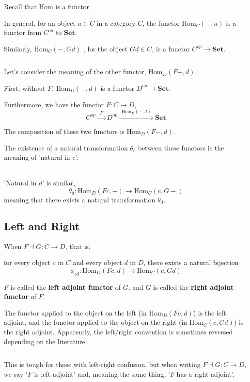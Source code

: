 \documentclass[uplatex,a4j,12pt,dvipdfmx]{jsarticle}
\begin{document}
Recall that Hom is a functor.

In general, for an object $a \in C$ in a category $C$,
the functor $\mathrm{Hom}_{C}(-,a)$ is a functor from $C^{op}$ to $\mathbf{Set}$.

Similarly,
$\mathrm{Hom}_{C}(-,Gd)$
, for the object $Gd \in C$,
is a functor $C^{op} \to \mathbf{Set}$.

${}$

Let's consider the meaning of the other functor,
$\mathrm{Hom}_{D}(F-,d)$.

First, without $F$,
$\mathrm{Hom}_{D}(-,d)$
is a functor
$D^{op} \to \mathbf{Set}$.

Furthermore, we have the functor $F: C \to D$,
$$
	C^{op} \xrightarrow{ \ \ F \ \ } D^{op} \xrightarrow{ \ \ \mathrm{Hom}_{D}(-,d) \ \ } \mathbf{Set}
$$

The composition of these two functors is
$\mathrm{Hom}_{D}(F-,d)$.

The existence of a natural transformation $\theta_{c}$ between these functors is the meaning of 'natural in $c$'.

\ \\

'Natural in $d$' is similar,
$$
	\theta_{d} : \mathrm{Hom}_{D}(Fc,-) \to \mathrm{Hom}_{C}(c,G-)
$$
meaning that there exists a natural transformation $\theta_{d}$.


\subsection{Left and Right}

When $F \dashv G : C \to D$, that is,

for every object $c$ in $C$ and every object $d$ in $D$, there exists a natural bijection
$$
	\phi_{cd} : \mathrm{Hom}_{D}(Fc,d) \to \mathrm{Hom}_{C}(c,Gd)
$$

$F$ is called the \textbf{left adjoint functor} of $G$,
and $G$ is called the \textbf{right adjoint functor} of $F$.

The functor applied to the object on the left (in $\mathrm{Hom}_{D}(Fc,d)$) is the left adjoint,
and the functor applied to the object on the right (in $\mathrm{Hom}_{C}(c,Gd)$) is the right adjoint.
Apparently, the left/right convention is sometimes reversed depending on the literature.

${}$

This is tough for those with left-right confusion, but
when writing
$F \dashv G : C \to D$,
we say '$F$ is left adjoint' and, meaning the same thing, '$F$ has a right adjoint'.
\end{document}
